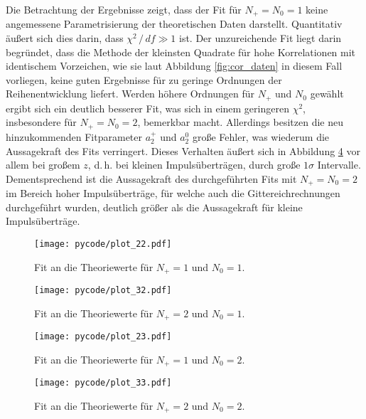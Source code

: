 Die Betrachtung der Ergebnisse zeigt, dass der Fit für $N_+ = N_0 = \num{1}$ keine angemessene Parametrisierung der theoretischen Daten darstellt.
Quantitativ äußert sich dies darin, dass $\chi^2 \,/\, df \gg \num{1}$ ist.
Der unzureichende Fit liegt darin begründet, dass die Methode der kleinsten Quadrate für hohe Korrelationen mit identischem Vorzeichen, wie sie laut Abbildung \ref{fig:cor_daten} in diesem Fall vorliegen, keine guten Ergebnisse für zu geringe Ordnungen der Reihenentwicklung liefert.
Werden höhere Ordnungen für $N_+$ und $N_0$ gewählt ergibt sich ein deutlich besserer Fit, was sich in einem geringeren $\chi^2$, insbesondere für $N_+=N_0=\num{2}$, bemerkbar macht.
Allerdings besitzen die neu hinzukommenden Fitparameter $a_2^+$ und $a_2^0$ große Fehler, was wiederum die Aussagekraft des Fits verringert.
Dieses Verhalten äußert sich in Abbildung \ref{fig:fit33} vor allem bei großem $z$, d.\,h. bei kleinen Impulsüberträgen, durch große $\num{1}\sigma$ Intervalle.
Dementsprechend ist die Aussagekraft des durchgeführten Fits mit $N_+=N_0=\num{2}$ im Bereich hoher Impulsüberträge, für welche auch die Gittereichrechnungen durchgeführt wurden, deutlich größer als die Aussagekraft für kleine Impulsüberträge.

\begin{figure}
  \centering
  \texttt{[image: pycode/plot\_22.pdf]}
  \caption{Fit an die Theoriewerte für $N_+ = \num{1}$ und $N_0 = \num{1}$.}
  \label{fig:fit22}
\end{figure}
\begin{figure}
  \centering
  \texttt{[image: pycode/plot\_32.pdf]}
  \caption{Fit an die Theoriewerte für $N_+ = \num{2}$ und $N_0 = \num{1}$.}
  \label{fig:fit32}
\end{figure}
\begin{figure}
  \centering
  \texttt{[image: pycode/plot\_23.pdf]}
  \caption{Fit an die Theoriewerte für $N_+ = \num{1}$ und $N_0 = \num{2}$.}
  \label{fig:fit23}
\end{figure}
\begin{figure}
  \centering
  \texttt{[image: pycode/plot\_33.pdf]}
  \caption{Fit an die Theoriewerte für $N_+ = \num{2}$ und $N_0 = \num{2}$.}
  \label{fig:fit33}
\end{figure}

